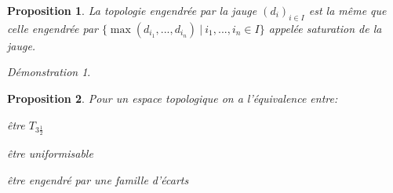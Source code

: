 \documentclass[a4paper, 11pt, french]{book}
\newenvironment{itemise}{\itemize}{\enditemize}
\let\colour=\color
\theoremstyle{plain} %
\newtheorem{proposition}{Proposition}
\theoremstyle{definition} %
\theoremstyle{remark} %
\newtheorem*{demonstration}{Démonstration}
\newcommand{\1}{\mathds{1}}
\newcommand\ens[2]{\{#1 \ |\ #2\}}
\begin{document}
\begin{proposition}
	La topologie engendrée par la jauge $(d_i)_{i\in I}$ est la même que celle engendrée par $\ens{\max(d_{i_1}, ..., d_{i_n})}{i_1, ..., i_n\in I}$ appelée saturation de la jauge.
\end{proposition}

\begin{demonstration}
	\colour{red}{À démontrer}
\end{demonstration}

\begin{proposition}
	Pour un espace topologique on a l'équivalence entre:
	\begin{itemise}
		\item être $T_{3\frac{1}{2}}$
		\item être uniformisable
		\item être engendré par une famille d'écarts
	\end{itemise}
\end{proposition}
\end{document}
